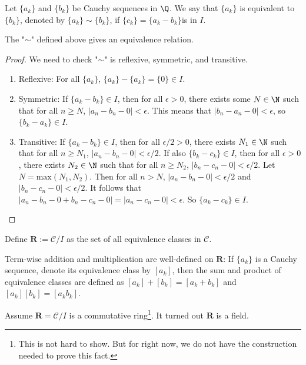 \documentclass[10pt]{article}
\begin{document}
\begin{definition}
    Let $\{a_k\}$ and $\{b_k\}$ be Cauchy sequences in $\Q$. We say that $\{a_k\}$ is equivalent to $\{b_k\}$, denoted by $\{a_k\}\sim\{b_k\}$, if $\{c_k\} = \{a_k-b_k\}$is in $I$.
\end{definition}
\begin{proposition}
    The "$\sim$" defined above gives an equivalence relation.
\end{proposition}
\begin{proof}
    We need to check "$\sim$" is reflexive, symmetric, and transitive.
    \begin{enumerate}
        \item[] Reflexive: For all $\{a_k\}$, $\{a_k\} - \{a_k\} = \{0\} \in I$.
        \item[] Symmetric: If $\{a_k - b_k\} \in I$, then for all $\epsilon > 0$, there exists some $N \in \N$ such that for all $ n \geq N$, $|a_n - b_n - 0| < \epsilon$. This means that $|b_n - a_n - 0| < \epsilon$, so $\{b_k - a_k\} \in I$.
        \item[] Transitive: If $\{a_k - b_k\} \in I$, then for all $\epsilon / 2 > 0$, there exists $N_1 \in \N$ such that for all $ n \geq N_1$, $|a_n - b_n - 0| <  \epsilon/ 2$. If also $\{b_k - c_k\} \in I$, then for all $ \epsilon > 0$, there exists $ N_2 \in \N$ such that for all $n \geq N_2$, $|b_n - c_n - 0| < \epsilon/ 2$. Let $N = \text{max}(N_1, N_2)$. Then for all $n > N$, $|a_n - b_n - 0| <  \epsilon/ 2$ and $|b_n - c_n - 0| <  \epsilon/ 2$. It follows that $|a_n - b_n - 0 + b_n - c_n - 0| = |a_n - c_n - 0| < \epsilon$. So $\{a_k - c_k\} \in I$.
    \end{enumerate}
\end{proof}
\begin{definition}
    Define $\textbf{R}:=\mathcal{C}/I$ as the set of all equivalence classes in $\mathcal{C}$.
\end{definition}
\begin{proposition}
    Term-wise addition and multiplication are well-defined on $\textbf{R}$: If $\{a_k\}$ is a Cauchy sequence, denote its equivalence class by $[a_k]$, then the sum and product of equivalence classes are defined as $[a_k] + [b_k] = [a_k + b_k]$ and $[a_k][b_k] = [a_kb_k]$.
\end{proposition}
\begin{proposition}
    Assume $\mathbf{R} = \mathcal{C}/I$ is a commutative ring\footnote{This is not hard to show. But for right now, we do not have the construction needed to prove this fact.}. It turned out $\mathbf{R}$ is a field.
\end{proposition}
\end{document}
